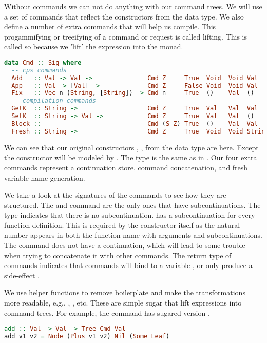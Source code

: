Without commands we can not do anything with our command trees. We will use a set of commands that reflect the constructors from the  data type. We also define a number of extra commands that will help us compile. This progammifying or treeifying of a command or request is called lifting. This is called so because we 'lift' the expression into the monad.

\begin{lstlisting}[language=Haskell]
data Cmd :: Sig where
  -- cps commands
  Add   :: Val -> Val ->               Cmd Z     True  Void  Void Val
  App   :: Val -> [Val] ->             Cmd Z     False Void  Void Val
  Fix   :: Vec n (String, [String]) -> Cmd n     True  ()    Val  ()
  -- compilation commands
  GetK  :: String ->                   Cmd Z     True  Val   Val  Val
  SetK  :: String -> Val ->            Cmd Z     True  Val   Val  ()
  Block ::                             Cmd (S Z) True  ()    Val  Val
  Fresh :: String ->                   Cmd Z     True  Void  Void String
\end{lstlisting}

We can see that our original constructors , ,  from the  data type are here. Except the  constructor will be modeled by . The  type is the same as in . Our four extra commands represent a continuation store, command concatenation, and fresh variable name generation.

We take a look at the signatures of the commands to see how they are structured. The  and  command are the only ones that have subcontinuations. The  type indicates that there is no subcontinuation.  has a subcontinuation for every function definition. This is required by the constructor itself as the natural number  appears in both the function name with arguments and subcontinuations. The  command does not have a continuation, which will lead to some trouble when trying to concatenate it with other commands. The return type of commands indicates that commands will bind to a variable , or only produce a side-effect \icode{()}.

We use helper functions to remove boilerplate and make the transformations more readable, e.g., , , etc. These are simple sugar that lift expressions into command trees. For example, the  command has sugared version .

\begin{lstlisting}[language=Haskell]
add :: Val -> Val -> Tree Cmd Val
add v1 v2 = Node (Plus v1 v2) Nil (Some Leaf)
\end{lstlisting}


